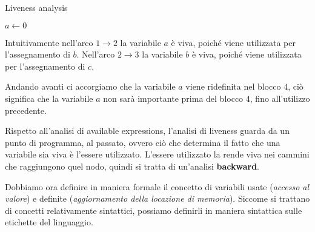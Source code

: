 \begin{minipage}{0.45\textwidth}
    \begin{algorithm}[H]
        \DontPrintSemicolon
        \caption{Liveness analysis}
        $a \gets 0$\;
        \;
    \end{algorithm}

    Intuitivamente nell'arco $1 \to 2$ la variabile $a$ è viva, poiché viene utilizzata
    per l'assegnamento di $b$. Nell'arco $2 \to 3$ la variabile $b$ è viva, poiché viene
    utilizzata per l'assegnamento di $c$.

    Andando avanti ci accorgiamo che la variabile $a$ viene ridefinita nel blocco $4$,
    ciò significa che la variabile $a$ non sarà importante prima del blocco $4$, fino 
    all'utilizzo precedente.
\end{minipage}
\begin{minipage}{0.5\textwidth}
    \begin{figure}[H]
        \centering
    \end{figure}
\end{minipage}

Rispetto all'analisi di available expressions, l'analisi di liveness guarda da un punto 
di programma, al passato, ovvero ciò che determina il fatto che una variabile sia viva
è l'essere utilizzato. L'essere utilizzato la rende viva nei cammini che raggiungono 
quel nodo, quindi si tratta di un'analisi \textbf{backward}.

Dobbiamo ora definire in maniera formale il concetto di variabili usate (\textit{accesso
al valore})
e definite (\textit{aggiornamento della locazione di memoria}). Siccome 
si trattano di concetti relativamente sintattici, possiamo definirli in maniera sintattica 
sulle etichette del linguaggio.

